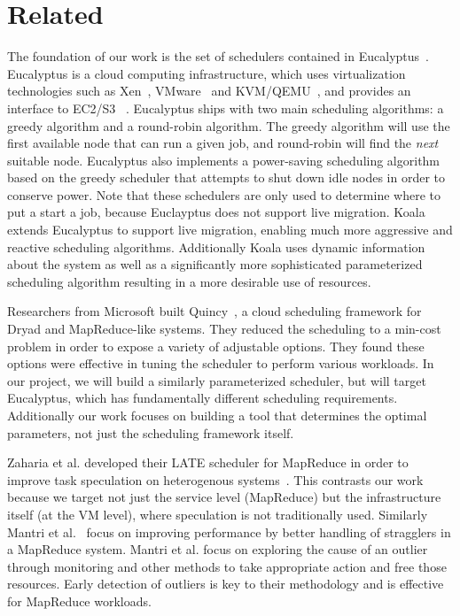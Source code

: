 \section{Related}

The foundation of our work is the set of schedulers contained in
Eucalyptus~\cite{Eucalyptus}.  Eucalyptus is a cloud computing infrastructure,
which uses virtualization technologies such as Xen~\cite{Xen},
VMware~\cite{VMware} and KVM/QEMU~\cite{QEMU}, and provides an interface to
EC2/S3 ~\cite{AWS}.   Eucalyptus ships with two main scheduling algorithms: a
greedy algorithm and a round-robin algorithm.  The greedy algorithm will use the
first available node that can run a given job, and round-robin will find the
\emph{next} suitable node.  Eucalyptus also implements a power-saving scheduling
algorithm based on the greedy scheduler that attempts to shut down idle nodes in
order to conserve power.  Note that these schedulers are only used to determine
where to put a start a job, because Euclayptus does not support live migration.
Koala extends Eucalyptus to support live migration, enabling much more
aggressive and reactive scheduling algorithms.  Additionally Koala uses dynamic
information about the system as well as a significantly more sophisticated
parameterized scheduling algorithm resulting in a more desirable use of
resources.

Researchers from Microsoft built Quincy~\cite{Quincy}, a cloud scheduling
framework for Dryad and MapReduce-like systems.  They reduced the scheduling to
a min-cost problem in order to expose a variety of adjustable options.  They
found these options were effective in tuning the scheduler to perform various
workloads.  In our project, we will build a similarly parameterized scheduler,
but will target Eucalyptus, which has fundamentally different scheduling
requirements.  Additionally our work focuses on building a tool that determines
the optimal parameters, not just the scheduling framework itself.

Zaharia et al. developed their LATE scheduler for MapReduce in order to improve
task speculation on heterogenous systems~\cite{Zaharia}.  This contrasts our
work because we target not just the service level (MapReduce) but the
infrastructure itself (at the VM level), where speculation is not traditionally
used.  Similarly Mantri et al.~\cite{Mantri} focus on improving performance by
better handling of stragglers  in a MapReduce system.  Mantri et al. focus on
exploring the cause of an outlier through monitoring and other methods to take
appropriate action and free those resources.  Early detection of outliers is key
to their methodology and is effective for MapReduce workloads.

